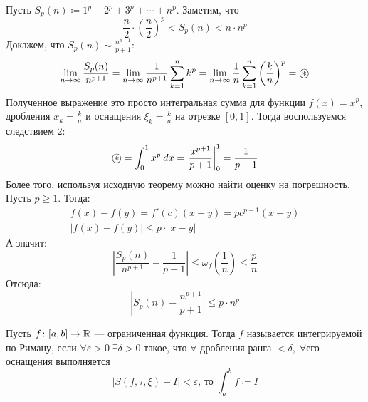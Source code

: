 \begin{example}
  Пусть $S_p(n) \coloneqq 1^p + 2^p + 3^p + \dotsb + n^p$. Заметим, что
  \begin{equation*}
    \frac{n}{2} \cdot \left(\frac{n}{2} \right)^p < S_p(n) < n \cdot n^p
  \end{equation*}
  Докажем, что $S_p(n) \sim \frac{n^{p + 1}}{p + 1}$:
  \begin{equation*}
      \lim\limits_{n \to \infty} \frac{S_p(n)}{n^{p + 1}} =
      \lim\limits_{n \to \infty} \frac{1}{n^{p + 1}}\sum_{k = 1}^{n} k^p =
      \lim\limits_{n \to \infty} \frac{1}{n}\sum_{k = 1}^{n} \left(\frac{k}{n}\right)^p = \oast
  \end{equation*}
  Полученное выражение это просто интегральная сумма для функции $f(x) = x^p$, дробления $x_k = \frac{k}{n}$ и оснащения $\xi_k = \frac{k}{n}$ на отрезке $[0, 1]$. Тогда воспользуемся следствием 2:
  \begin{equation*}
      \oast = \int_{0}^{1} x^p \: dx = \left. \frac{x^{p + 1}}{p + 1} \right|_{0}^{1} = \frac{1}{p + 1}
  \end{equation*}
  Более того, используя исходную теорему можно найти оценку на погрешность. Пусть $p \geq 1$. Тогда:
  \begin{equation*}
    \begin{gathered}
      f(x) - f(y) = f'(c)(x - y) = pc^{p - 1}(x - y) \\
      | f(x) - f(y) | \leq p \cdot |x - y|
    \end{gathered}
  \end{equation*}
  А значит:
  \begin{equation*}
    \left |
      \frac{S_p(n)}{n^{p + 1}} - \frac{1}{p + 1}
    \right |
    \leq \omega_f\left(\frac{1}{n}\right) \leq \frac{p}{n}
  \end{equation*}
  Отсюда:
  \begin{equation*}
    \left |
      S_p(n) -
      \frac{n^{p + 1}}{p + 1}
    \right |
    \leq p \cdot n^p
  \end{equation*}
\end{example}

\begin{conj}
    Пусть $f\colon [a, b] \to \mathbb{R}$ --- ограниченная функция.
    Тогда $f$ называется интегрируемой по Риману, если $\forall \varepsilon > 0 \; \exists \delta > 0$ такое, что $\forall$ дробления ранга $< \delta,\; \forall$его оснащения выполняется
    \begin{equation*}
        | S(f, \tau, \xi) - I| < \varepsilon\text{, то } \int_{a}^{b} f \coloneqq I
    \end{equation*}
\end{conj}